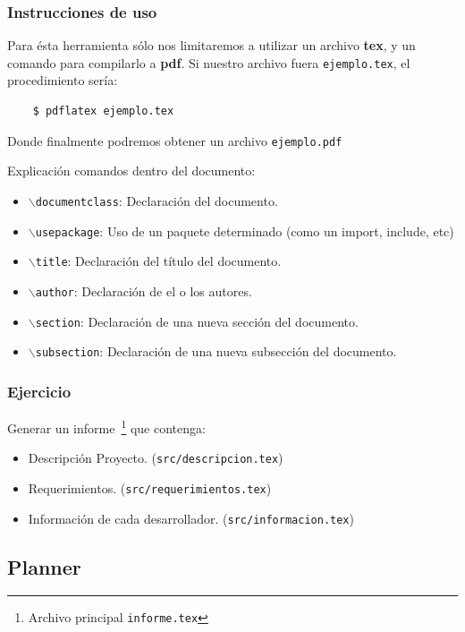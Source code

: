 \subsubsection{Instrucciones de uso}

Para ésta herramienta sólo nos limitaremos a utilizar un archivo \textbf{tex},
y un comando para compilarlo a \textbf{pdf}.
Si nuestro archivo fuera \texttt{ejemplo.tex}, el procedimiento sería:
\begin{verbatim}
    $ pdflatex ejemplo.tex
\end{verbatim}
Donde finalmente podremos obtener un archivo \texttt{ejemplo.pdf}

Explicación comandos dentro del documento:
\begin{itemize}
    \item \texttt{$\backslash$documentclass}: Declaración del documento.
    \item \texttt{$\backslash$usepackage}: Uso de un paquete determinado (como un import, include, etc)
    \item \texttt{$\backslash$title}: Declaración del título del documento.
    \item \texttt{$\backslash$author}: Declaración de el o los autores.
    \item \texttt{$\backslash$section}: Declaración de una nueva sección del documento.
    \item \texttt{$\backslash$subsection}: Declaración de una nueva subsección del documento.
\end{itemize}

\subsubsection{Ejercicio}
Generar un informe~\footnote{Archivo principal \texttt{informe.tex}} que contenga:

\begin{itemize}
    \item Descripción Proyecto. (\texttt{src/descripcion.tex})
    \item Requerimientos. (\texttt{src/requerimientos.tex})
    \item Información de cada desarrollador. (\texttt{src/informacion.tex})
\end{itemize}

\newpage

\subsection{Planner}

